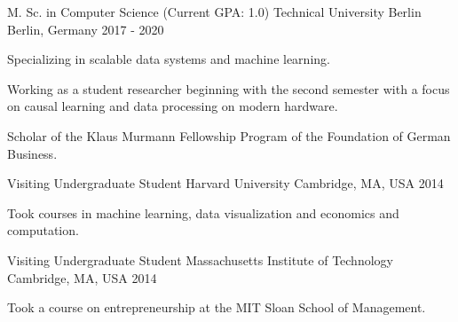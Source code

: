 

\begin{cventries}

  \cventry
    {M. Sc. in Computer Science (Current GPA: 1.0)} %
    {Technical University Berlin} %
    {Berlin, Germany} %
    {2017 - 2020} %
    {
      \begin{cvitems} %
        \item{Specializing in scalable data systems and machine learning.}
        \item{Working as a student researcher beginning with the second semester with a focus on causal learning and data processing on modern hardware.}
        \item{Scholar of the Klaus Murmann Fellowship Program of the Foundation of German Business.}
      \end{cvitems}
    }

  \cventry
    {Visiting Undergraduate Student} %
    {Harvard University} %
    {Cambridge, MA, USA} %
    {2014} %
    {
      \begin{cvitems} %
        \item{Took courses in machine learning, data visualization and economics and computation.}
      \end{cvitems}
    }

  \cventry
    {Visiting Undergraduate Student} %
    {Massachusetts Institute of Technology} %
    {Cambridge, MA, USA} %
    {2014} %
    {
      \begin{cvitems} %
        \item{Took a course on entrepreneurship at the MIT Sloan School of Management.}
      \end{cvitems}
    }


\end{cventries}
